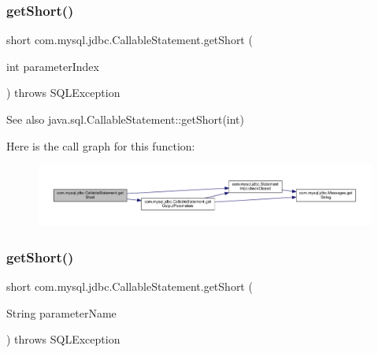 \subsubsection{\texorpdfstring{get\+Short()}{getShort()}\hspace{0.1cm}{\footnotesize\ttfamily [1/2]}}
{\footnotesize\ttfamily short com.\+mysql.\+jdbc.\+Callable\+Statement.\+get\+Short (\begin{DoxyParamCaption}\item[{int}]{parameter\+Index }\end{DoxyParamCaption}) throws S\+Q\+L\+Exception}

\begin{DoxySeeAlso}{See also}
java.\+sql.\+Callable\+Statement\+::get\+Short(int) 
\end{DoxySeeAlso}
Here is the call graph for this function\+:\nopagebreak
\begin{figure}[H]
\begin{center}
\leavevmode
\includegraphics[width=350pt]{classcom_1_1mysql_1_1jdbc_1_1_callable_statement_aa7732fb063990b1e3719aa6d33f0ba7c_cgraph}
\end{center}
\end{figure}
\mbox{\label{classcom_1_1mysql_1_1jdbc_1_1_callable_statement_af83744782126809276a8ddb6219abc7f}} 
\subsubsection{\texorpdfstring{get\+Short()}{getShort()}\hspace{0.1cm}{\footnotesize\ttfamily [2/2]}}
{\footnotesize\ttfamily short com.\+mysql.\+jdbc.\+Callable\+Statement.\+get\+Short (\begin{DoxyParamCaption}\item[{String}]{parameter\+Name }\end{DoxyParamCaption}) throws S\+Q\+L\+Exception}

